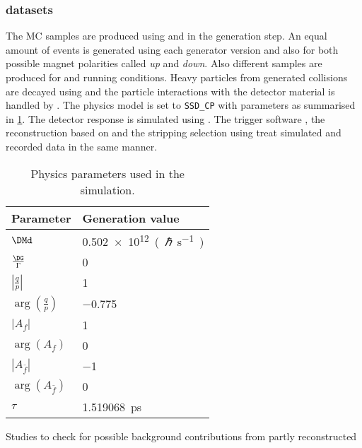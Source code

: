 \subsubsection{\MC datasets}
\label{sec:measurement_of_sin2beta:data_preparation:datasamples:mc}

The \acf{MC} samples are produced using \PythiaSix and \PythiaEight in the
generation step. An equal amount of events is generated using each generator
version and also for both possible magnet polarities called \emph{up} and
\emph{down}. Also different samples are produced for \catOO and \catOT running
conditions. Heavy particles from generated \protonproton collisions are decayed
using \EvtGen and the particle interactions with the \LHCb detector material is
handled by \GeantFour. The \EvtGen physics model is set to \Verb=SSD_CP= with
parameters as summarised in
\cref{tab:measurement_of_sin2beta:data_preparation:datasamples:mc:decfile}. The
detector response is simulated using \Boole. The \LHCb trigger software \Moore,
the reconstruction based on \Brunel and the stripping selection using \DaVinci
treat simulated and recorded data in the same manner.
%
\begin{table}[!htb]
\centering
\caption{Physics parameters used in the simulation.}
\label{tab:measurement_of_sin2beta:data_preparation:datasamples:mc:decfile}
\begin{tabular}{ll}
\toprule
Parameter                            & Generation value \\
\midrule
$\DMd$                               & \SI{0.502e12}{(\planckbar\per\second)} \\
$\frac{\DG}{\Gamma}$                 & \num{0} \\
$\left\vert\frac{q}{p}\right\vert$   & \num{1} \\
$\arg(\frac{q}{p})$                  & \num{-0.775} \\
$\vert A_f \vert$                    & \num{1} \\
$\arg(A_f)$                          & \num{0} \\
$\left\vert A_{\bar{f}} \right\vert$ & \num{-1}  \\
$\arg(A_{\bar{f}})$                  & \num{0} \\
$\tau$                               & \SI{1.519068}{\pico\second}\\
\bottomrule
\end{tabular}
\end{table}
%
Studies to check for possible background contributions from partly reconstructed
